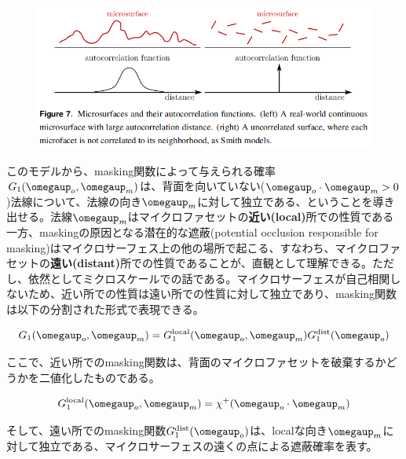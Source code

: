 \documentclass[a4j,xelatex,ja=standard]{bxjsarticle}
\begin{document}
\begin{figure}
    \includegraphics[width=\textwidth]{Figure7.png}
    \caption{}
    \label{fig:7}
\end{figure}

このモデルから、masking関数によって与えられる確率$G_1(\boldsymbol{\omegaup}_o, \boldsymbol{\omegaup}_m)$は、背面を向いていない($\boldsymbol{\omegaup}_o \cdot \boldsymbol{\omegaup}_m > 0$)法線について、法線の向き$\boldsymbol{\omegaup}_m$に対して独立である、ということを導き出せる。法線$\boldsymbol{\omegaup}_m$はマイクロファセットの\textbf{近い(local)}所での性質である一方、maskingの原因となる潜在的な遮蔽(potential occlusion responsible for masking)はマイクロサーフェス上の他の場所で起こる、すなわち、マイクロファセットの\textbf{遠い(distant)}所での性質であることが、直観として理解できる。ただし、依然としてミクロスケールでの話である。マイクロサーフェスが自己相関しないため、近い所での性質は遠い所での性質に対して独立であり、masking関数は以下の分割された形式で表現できる。

\begin{equation}
    G_1(\boldsymbol{\omegaup}_o, \boldsymbol{\omegaup}_m) = G_1^{\text{local}}(\boldsymbol{\omegaup}_o, \boldsymbol{\omegaup}_m) G_1^{\text{dist}}(\boldsymbol{\omegaup}_o)
    \label{eq:38}
\end{equation}

ここで、近い所でのmasking関数は、背面のマイクロファセットを破棄するかどうかを二値化したものである。

\begin{equation}
    G_1^{\text{local}}(\boldsymbol{\omegaup}_o, \boldsymbol{\omegaup}_m) = \chi^+(\boldsymbol{\omegaup}_o \cdot \boldsymbol{\omegaup}_m)
    \label{eq:39}
\end{equation}

そして、遠い所でのmasking関数$G_1^{\text{dist}}(\boldsymbol{\omegaup}_o)$は、localな向き$\boldsymbol{\omegaup}_m$に対して独立である、マイクロサーフェスの遠くの点による遮蔽確率を表す。
\end{document}
